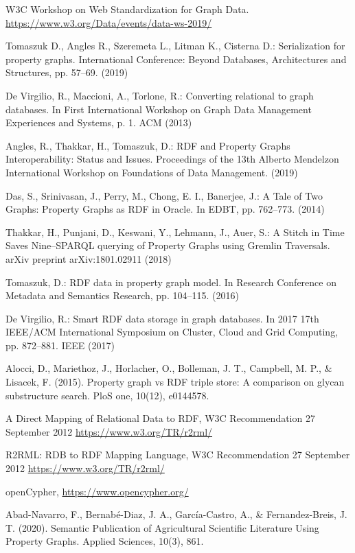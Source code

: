 \documentclass[runningheads]{llncs}
\begin{document}
\begin{thebibliography}{8}
W3C Workshop on Web Standardization for Graph Data. \url{https://www.w3.org/Data/events/data-ws-2019/}

Tomaszuk D., Angles R., Szeremeta L., Litman K., Cisterna D.:
Serialization for property graphs. International Conference: Beyond Databases, Architectures and Structures, pp. 57--69. (2019)

De Virgilio, R., Maccioni, A., Torlone, R.: Converting relational to graph databases. In First International Workshop on Graph Data Management Experiences and Systems, p. 1. ACM (2013)

Angles, R., Thakkar, H., Tomaszuk, D.: RDF and Property Graphs Interoperability: Status and Issues. Proceedings of the 13th Alberto Mendelzon International Workshop on Foundations of Data Management. (2019)

Das, S., Srinivasan, J., Perry, M., Chong, E. I., Banerjee, J.: A Tale of Two Graphs: Property Graphs as RDF in Oracle. In EDBT, pp. 762--773. (2014)

Thakkar, H., Punjani, D., Keswani, Y., Lehmann, J., Auer, S.: A Stitch in Time Saves Nine--SPARQL querying of Property Graphs using Gremlin Traversals. arXiv preprint arXiv:1801.02911 (2018)

Tomaszuk, D.: RDF data in property graph model. In Research Conference on Metadata and Semantics Research, pp. 104--115. (2016)

De Virgilio, R.: Smart RDF data storage in graph databases. In 2017 17th IEEE/ACM International Symposium on Cluster, Cloud and Grid Computing, pp. 872--881. IEEE (2017)

Alocci, D., Mariethoz, J., Horlacher, O., Bolleman, J. T., Campbell, M. P., & Lisacek, F. (2015). Property graph vs RDF triple store: A comparison on glycan substructure search. PloS one, 10(12), e0144578.

A Direct Mapping of Relational Data to RDF, W3C Recommendation 27 September 2012 \url{https://www.w3.org/TR/r2rml/}

R2RML: RDB to RDF Mapping Language, W3C Recommendation 27 September 2012 \url{https://www.w3.org/TR/r2rml/}

openCypher, \url{https://www.opencypher.org/}

Abad-Navarro, F., Bernabé-Diaz, J. A., García-Castro, A., & Fernandez-Breis, J. T. (2020). Semantic Publication of Agricultural Scientific Literature Using Property Graphs. Applied Sciences, 10(3), 861.


\end{thebibliography}
\end{document}
